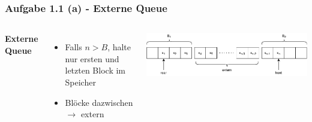 \documentclass[aspectratio=169]{beamer}
\begin{document}
\begin{frame}
	\frametitle{Aufgabe 1.1 (a) - Externe Queue}
	\begin{columns}[c] %
	
	\textbf{Externe Queue}
	\begin{itemize}
		\item Falls $n>B$, halte nur ersten und letzten Block im Speicher
		\item Blöcke dazwischen $\rightarrow$ extern
	\end{itemize}
	
	\includegraphics[scale=.5]{queue1.pdf}
	
	\end{columns}
	\end{frame}
\end{document}

